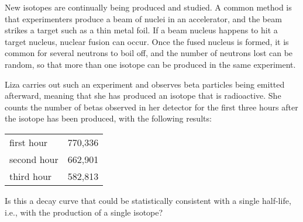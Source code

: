 New isotopes are continually being produced and studied. A common method is
that experimenters produce a beam of nuclei in an accelerator, and the beam
strikes a target such as a thin metal foil. If a beam nucleus happens to hit
a target nucleus, nuclear fusion can occur. Once the fused nucleus is formed, it is common for
several neutrons to boil off, and the number of neutrons lost can be random, so that
more than one isotope can be produced in the same experiment.

Liza carries out such an experiment and observes beta particles being emitted afterward,
meaning that she has produced an isotope that is radioactive. She counts the number of
betas observed in her detector for the first three hours after the isotope has been
produced, with the following results:

\begin{tabular}{ll}
first hour  &  770,336 \\
second hour &  662,901 \\
third hour  &  582,813
\end{tabular}

Is this a decay curve that could be statistically consistent with a single half-life,
i.e., with the production of a single isotope?
